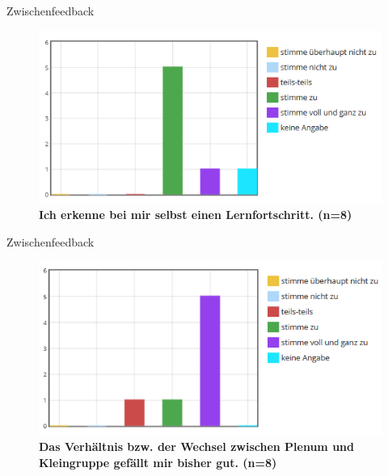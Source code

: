 \documentclass[11pt]{beamer}
\begin{document}
\begin{frame}{Zwischenfeedback}
\begin{figure}[ht]
	\includegraphics[width=\textwidth]{./pics/lernfortschritt.png}
	\caption{\textbf{Ich erkenne bei mir selbst einen Lernfortschritt. (n=8)}}
\end{figure}
\end{frame}

\begin{frame}{Zwischenfeedback}
\begin{figure}[ht]
	\includegraphics[width=\textwidth]{./pics/wechsel.png}
	\caption{\textbf{Das Verhältnis bzw. der Wechsel zwischen Plenum und Kleingruppe gefällt mir bisher gut. (n=8)}}
\end{figure}
\end{frame}
\end{document}
